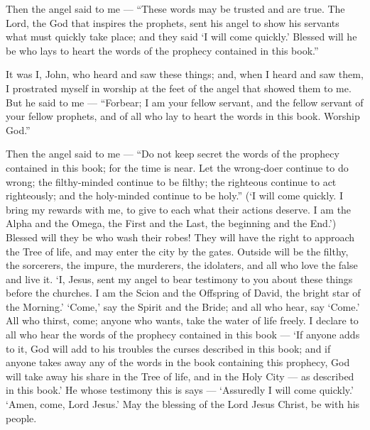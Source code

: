  Then the angel said to me --- ``These words may be trusted
and are true. The Lord, the God that inspires the prophets, sent his
angel to show his servants what must quickly take place; 
and they said `I will come quickly.' Blessed will he be who lays to
heart the words of the prophecy contained in this book.''

 It was I, John, who heard and saw these things; and, when I
heard and saw them, I prostrated myself in worship at the feet of the
angel that showed them to me.  But he said to me ---
``Forbear; I am your fellow servant, and the fellow servant of your
fellow prophets, and of all who lay to heart the words in this book.
Worship God.''

 Then the angel said to me --- ``Do not keep secret the
words of the prophecy contained in this book; for the time is near.
 Let the wrong-doer continue to do wrong; the filthy-minded
continue to be filthy; the righteous continue to act righteously; and
the holy-minded continue to be holy.''  (`I will come
quickly. I bring my rewards with me, to give to each what their actions
deserve.  I am the Alpha and the Omega, the First and the
Last, the beginning and the End.')  Blessed will they be
who wash their robes! They will have the right to approach the Tree of
life, and may enter the city by the gates.  Outside will be
the filthy, the sorcerers, the impure, the murderers, the idolaters, and
all who love the false and live it.  `I, Jesus, sent my
angel to bear testimony to you about these things before the churches. I
am the Scion and the Offspring of David, the bright star of the
Morning.'  `Come,' say the Spirit and the Bride; and all
who hear, say `Come.' All who thirst, come; anyone who wants, take the
water of life freely.  I declare to all who hear the words
of the prophecy contained in this book --- `If anyone adds to it, God
will add to his troubles the curses described in this book;
 and if anyone takes away any of the words in the book
containing this prophecy, God will take away his share in the Tree of
life, and in the Holy City --- as described in this book.' 
He whose testimony this is says --- `Assuredly I will come quickly.'
`Amen, come, Lord Jesus.'  May the blessing of the Lord
Jesus Christ, be with his people.
